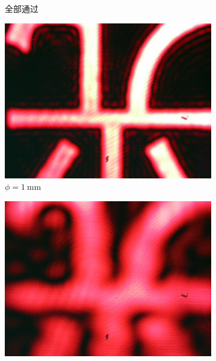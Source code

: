 \documentclass[a4paper]{article}
\begin{document}
\begin{figure}[H]
\begin{subfigure}[t]{0.4\textwidth}
        \caption{全部通过}
        \label{fig6-1}
    \end{subfigure}
    \begin{subfigure}[t]{0.3\textwidth}
        \centering
        \includegraphics[width=\textwidth]{img2-done/5-2.JPG}
        \caption{$\phi=\SI{1}{\mm}$}
        \label{fig6-2}
    \end{subfigure}
    \begin{subfigure}[t]{0.3\textwidth}
        \centering
        \includegraphics[width=\textwidth]{img2-done/5-3.JPG}

\end{subfigure}
\end{figure}
\end{document}
